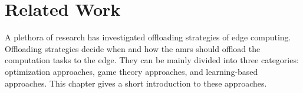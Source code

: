 \chapter{Related Work}\label{ch:related_works}

A plethora of research has investigated offloading strategies of edge computing. Offloading strategies decide when and how the \glspl{amr} should offload the computation tasks to the edge. They can be mainly divided into three categories: optimization approaches, game theory approaches, and learning-based approaches. This chapter gives a short introduction to these approaches. 











